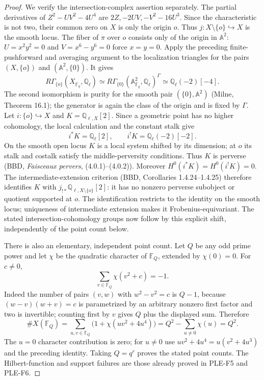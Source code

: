\documentclass[11pt,a4paper]{article}
\begin{document}
\begin{proof}
We verify the intersection-complex assertion separately. The partial
derivatives of $Z^2-UV^2-4U^4$ are
$2Z,-2UV,-V^2-16U^3$. Since the characteristic is not two, their
common zero on $X$ is only the origin $o$. Thus
$j:X\setminus\{o\}\hookrightarrow X$ is the smooth locus.
The fiber of $\pi$ over $o$ consists only of the origin in $\mathbb A^2$:
$U=x^2y^2=0$ and $V=x^6-y^6=0$ force $x=y=0$.
Apply the preceding finite-pushforward and averaging argument to the
localization triangles for the pairs $(X,\{o\})$ and
$(\mathbb A^2,\{0\})$. It gives
\[
 R\Gamma_{\{o\}}(X_{\overline{\mathbb F}_q},\mathbb Q_\ell)
 \simeq
 R\Gamma_{\{0\}}(\mathbb A^2_{\overline{\mathbb F}_q},
                 \mathbb Q_\ell)^\Gamma
 \simeq \mathbb Q_\ell(-2)[-4].
\]
The second isomorphism is purity for the smooth pair
$(\{0\},\mathbb A^2)$ (Milne, Theorem 16.1); the generator is again
the class of the origin and is fixed by $\Gamma$.
Let $i:\{o\}\hookrightarrow X$ and $K=\mathbb Q_{\ell,X}[2]$.
Since a geometric point has no higher cohomology, the local calculation
and the constant stalk give
\[
 i^*K=\mathbb Q_\ell[2],\qquad
 i^!K=\mathbb Q_\ell(-2)[-2].
\]
On the smooth open locus $K$ is a local system shifted by its dimension;
at $o$ its stalk and costalk satisfy the middle-perversity conditions.
Thus $K$ is perverse (BBD, \emph{Faisceaux pervers},
(4.0.1)--(4.0.2)). Moreover $H^0(i^*K)=H^0(i^!K)=0$.
The intermediate-extension criterion (BBD, Corollaries 1.4.24--1.4.25)
therefore identifies $K$ with $j_{!*}\mathbb Q_{\ell,X\setminus\{o\}}[2]$:
it has no nonzero perverse subobject or quotient supported at $o$.
The identification restricts to the identity on the smooth locus;
uniqueness of intermediate extension makes it Frobenius-equivariant.
The stated intersection-cohomology groups now follow by this explicit
shift, independently of the point count below.

There is also an elementary, independent point count. Let $Q$ be any odd
prime power and let $\chi$ be the quadratic character of $\mathbb F_Q$,
extended by $\chi(0)=0$. For $c\ne0$,
\[
 \sum_{v\in\mathbb F_Q}\chi(v^2+c)=-1.
\]
Indeed the number of pairs $(v,w)$ with $w^2-v^2=c$ is $Q-1$,
because $(w-v)(w+v)=c$ is parametrized by an arbitrary nonzero first
factor and two is invertible; counting first by $v$ gives $Q$ plus the
displayed sum. Therefore
\[
 \#X(\mathbb F_Q)
 =\sum_{u,v\in\mathbb F_Q}\bigl(1+\chi(uv^2+4u^4)\bigr)
 =Q^2-\sum_{u\ne0}\chi(u)=Q^2.
\]
The $u=0$ character contribution is zero; for $u\ne0$ use
$uv^2+4u^4=u(v^2+4u^3)$ and the preceding identity. Taking $Q=q^r$
proves the stated point counts. The Hilbert-function and support
failures are those already proved in PLE-F5 and PLE-F6.
\end{proof}
\end{document}
